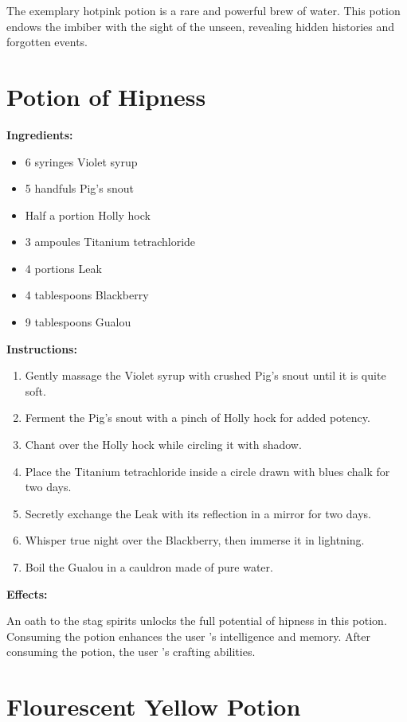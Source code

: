 \documentclass{article}
\begin{document}
The exemplary hotpink potion is a rare and powerful brew of water. This potion endows the imbiber with the sight of the unseen, revealing hidden histories and forgotten events.

\newpage
\section*{Potion of Hipness}

\textbf{Ingredients:}

\begin{itemize}
  \item 6 syringes Violet syrup
  \item 5 handfuls Pig's snout
  \item Half a portion Holly hock
  \item 3 ampoules Titanium tetrachloride
  \item 4 portions Leak
  \item 4 tablespoons Blackberry
  \item 9 tablespoons Gualou
\end{itemize}

\textbf{Instructions:}

\begin{enumerate}
  \item Gently massage the Violet syrup with crushed Pig's snout until it is quite soft.
  \item Ferment the Pig's snout with a pinch of Holly hock for added potency.
  \item Chant over the Holly hock while circling it with shadow.
  \item Place the Titanium tetrachloride inside a circle drawn with blues chalk for two days.
  \item Secretly exchange the Leak with its reflection in a mirror for two days.
  \item Whisper true night over the Blackberry, then immerse it in lightning.
  \item Boil the Gualou in a cauldron made of pure water.
\end{enumerate}

\textbf{Effects:}

An oath to the stag spirits unlocks the full potential of hipness in this potion. Consuming the potion enhances the user 's intelligence and memory. After consuming the potion, the user 's crafting abilities.

\newpage
\section*{Flourescent Yellow Potion}
\end{document}
